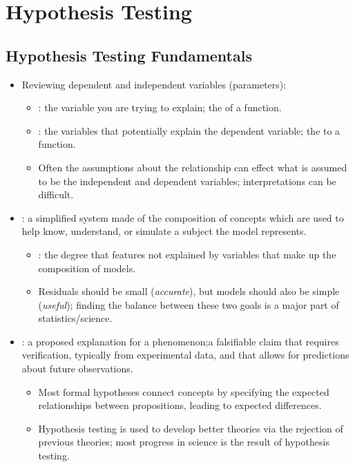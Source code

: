 \chapter{Hypothesis Testing}

\section{Hypothesis Testing Fundamentals}
\begin{itemize}
  \item Reviewing dependent and independent variables (parameters):
    \begin{itemize}
      \item {}: the variable you are trying to explain; the  of a function.
      \item {}: the variables that potentially explain the dependent variable; the  to a function.
      \item Often the assumptions about the relationship can effect what is assumed to be the independent and dependent variables; interpretations can be difficult.
    \end{itemize}
  \item {}: a simplified system made of the composition of concepts which are used to help know, understand, or simulate a subject the model represents.
    \begin{itemize}
      \item {}: the degree that features not explained by variables that make up the composition of models. 
      \item Residuals should be small (\emph{accurate}), but models should also be simple (\emph{useful}); finding the balance between these two goals is a major part of statistics/science.
    \end{itemize}
  \item {}: a proposed explanation for a phenomenon;a falsifiable claim that requires verification, typically from experimental data, and that allows for predictions about future observations.
    \begin{itemize}
      \item Most formal hypotheses connect concepts by specifying the expected relationships between propositions, leading to expected differences.
      \item Hypothesis testing is used to develop better theories via the rejection of previous theories; most progress in science is the result of hypothesis testing.

\end{itemize}
\end{itemize}
